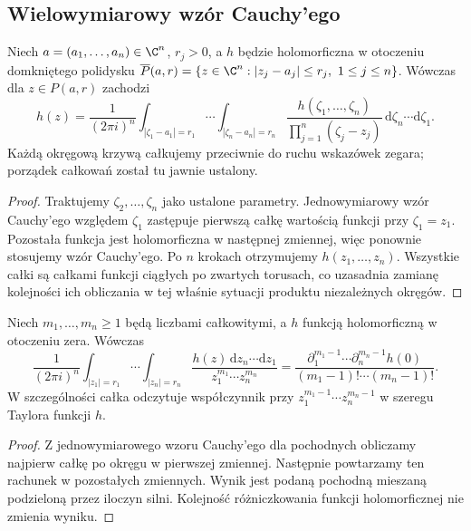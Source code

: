 \subsection{Wielowymiarowy wzór Cauchy'ego}
\label{subsec:ga4-cauchy-product}

\begin{twierdzenie}
\label{tw:ga4-polydisc-cauchy}
Niech $a=(a_1,\ldots,a_n)\in\C^n$, $r_j>0$, a $h$ będzie
holomorficzna w otoczeniu domkniętego polidysku
$\overline P(a,r)=\{z\in\C^n:|z_j-a_j|\le r_j,\ 1\le j\le n\}$.
Wówczas dla $z\in P(a,r)$ zachodzi
\[
 h(z)=\frac{1}{(2\pi i)^n}
 \int_{|\zeta_1-a_1|=r_1}\!\cdots
 \int_{|\zeta_n-a_n|=r_n}
 \frac{h(\zeta_1,\ldots,\zeta_n)}
 {\prod_{j=1}^n(\zeta_j-z_j)}
 \,\mathrm d\zeta_n\cdots\mathrm d\zeta_1.
\]
Każdą okręgową krzywą całkujemy przeciwnie do ruchu wskazówek
zegara; porządek całkowań został tu jawnie ustalony.
\end{twierdzenie}
\begin{proof}
Traktujemy $\zeta_2,\ldots,\zeta_n$ jako ustalone parametry.
Jednowymiarowy wzór Cauchy'ego względem $\zeta_1$ zastępuje
pierwszą całkę wartością funkcji przy $\zeta_1=z_1$.
Pozostała funkcja jest holomorficzna w następnej zmiennej,
więc ponownie stosujemy wzór Cauchy'ego. Po $n$ krokach
otrzymujemy $h(z_1,\ldots,z_n)$.
Wszystkie całki są całkami funkcji ciągłych po zwartych torusach,
co uzasadnia zamianę kolejności ich obliczania w tej właśnie
sytuacji produktu niezależnych okręgów.
\end{proof}

\begin{wniosek}
\label{wn:ga4-monomial-res}
Niech $m_1,\ldots,m_n\ge1$ będą liczbami całkowitymi,
a $h$ funkcją holomorficzną w otoczeniu zera. Wówczas
\[
\frac{1}{(2\pi i)^n}\int_{|z_1|=r_1}\!\cdots
\int_{|z_n|=r_n}
\frac{h(z)\,\mathrm dz_n\cdots\mathrm dz_1}
{z_1^{m_1}\cdots z_n^{m_n}}
=\frac{\partial_1^{m_1-1}\cdots\partial_n^{m_n-1}h(0)}
{(m_1-1)!\cdots(m_n-1)!}.
\]
W szczególności całka odczytuje współczynnik przy
$z_1^{m_1-1}\cdots z_n^{m_n-1}$ w szeregu Taylora funkcji $h$.
\end{wniosek}
\begin{proof}
Z jednowymiarowego wzoru Cauchy'ego dla pochodnych
obliczamy najpierw całkę po okręgu w pierwszej zmiennej.
Następnie powtarzamy ten rachunek w pozostałych zmiennych.
Wynik jest podaną pochodną mieszaną podzieloną przez
iloczyn silni. Kolejność różniczkowania funkcji
holomorficznej nie zmienia wyniku.
\end{proof}

